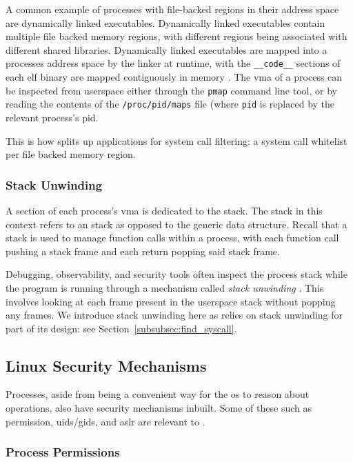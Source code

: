 A common example of processes with file-backed regions in their address space
are dynamically linked executables. Dynamically linked executables contain
multiple file backed memory regions, with different regions being associated
with different shared libraries. Dynamically linked executables are mapped
into a processes address space by the linker at runtime, with the
\texttt{\_\_code\_\_} sections of each \ac{elf} binary are mapped contiguously 
in memory \cite{DYNAMIC_LINKERS_OS}. The \ac{vma} of a process can be
inspected from userspace either through the \texttt{pmap} command line tool, or
by reading the contents of the \texttt{/proc/pid/maps} file (where \texttt{pid}
is replaced by the relevant process's \ac{pid}.

This is how \af splits up applications for system call filtering: a system call
whitelist per file backed memory region.

\subsubsection{Stack Unwinding}

A section of each process's \ac{vma} is dedicated to the stack. The stack in
this context refers to an  stack as opposed to the generic data
structure. Recall that a stack is used to manage function calls within a
process, with each function call pushing a stack frame and each return popping
said stack frame.
 
Debugging, observability, and security tools often inspect the process stack
while the program is running through a mechanism called \textit{stack
unwinding} \cite{gregg2014linux, kilroy2022linker}. This involves looking at 
each frame present in the userspace stack without popping any frames. We
introduce stack unwinding here as \af relies on stack unwinding for part of
its design: see Section~\ref{subsubsec:find_syscall}.

\subsection{Linux Security Mechanisms}

Processes, aside from being a convenient way for the \ac{os} to reason about
operations, also have security mechanisms inbuilt. Some of these such as
permission, \acp{uid}/\acp{gid}, and \ac{aslr} are relevant to \af.

\subsubsection{Process Permissions}

